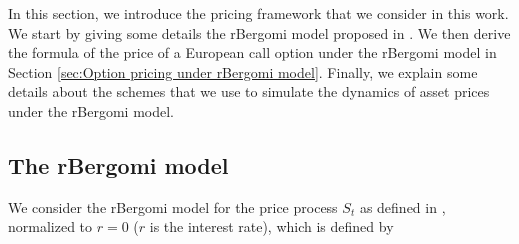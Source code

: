 In this section, we introduce the pricing framework that we consider in this work. We start  by giving some details  the rBergomi model proposed in \cite{bayer2016pricing}. We then derive the formula of the price of a European call option under the rBergomi model in Section \ref{sec:Option pricing under rBergomi model}. Finally, we explain  some details about the schemes that we use to simulate the dynamics of asset prices under the rBergomi model.

\subsection{The rBergomi model}\label{sec:The rBergomi model}

We consider the rBergomi model for the price process $S_t$ as defined in  \cite{bayer2016pricing}, normalized to $r=0$ ($r$ is the interest rate), which is defined by

